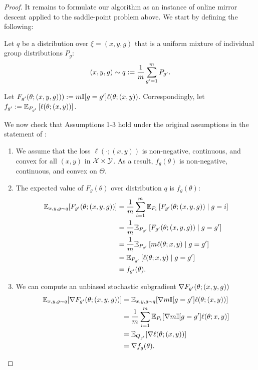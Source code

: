 \begin{proof}
  It remains to formulate our algorithm as an instance of online mirror descent applied to the saddle-point problem above. We start by defining the following:
  \begin{definition}
    Let $q$ be a distribution over $\xi = (x,y,g)$
    that is a uniform mixture of individual group distributions $P_g$:
    \begin{align}
        (x,y,g) \sim q := \frac{1}{m}\sum_{g^\prime=1}^{m} P_{g^\prime}.
    \end{align}
  \end{definition}

  \begin{definition}
    Let $F_{g^\prime}(\theta; (x,y,g))) := m\mathbb{I}[g=g^\prime]\ell(\theta; (x,y))$.
    Correspondingly, let $f_{g^\prime} := \mathbb{E}_{P_{g^\prime}}\left[\ell(\theta; (x,y))\right]$.
  \end{definition}

  We now check that Assumptions 1-3 hold under the original assumptions in the statement of :
  \begin{enumerate}
    \item We assume that the loss $\ell(\cdot; (x, y))$ is non-negative, continuous, and convex for all $(x, y)$ in $\mathcal{X} \times \mathcal{Y}$. As a result, $f_g(\theta)$ is non-negative, continuous, and convex on $\Theta$.

    \item The expected value of $F_{g}(\theta)$ over distribution $q$ is $f_g(\theta)$:
    \begin{align*}
        \mathbb{E}_{x,y,g\sim q}[F_{g^\prime}(\theta; (x,y,g))]
        &= \frac{1}{m}\sum_{i=1}^{m} \mathbb{E}_{P_{i}}\left[F_{g^\prime}(\theta; (x,y,g)) \mid g=i\right]\\
        &= \frac{1}{m} \mathbb{E}_{P_{g^\prime}}\left[F_{g^\prime}(\theta; (x,y,g))\mid g=g^\prime\right] \\
        &= \frac{1}{m} \mathbb{E}_{P_{g^\prime}}\left[m\ell(\theta; x,y) \mid g=g^\prime\right] \\
        &= \mathbb{E}_{P_{g^\prime}}\left[\ell(\theta; x,y) \mid g=g^\prime\right] \\
        &= f_{g^\prime}(\theta).
    \end{align*}

    \item We can compute an unbiased stochastic subgradient $\nabla F_{g^\prime}(\theta; (x,y,g))$
    \begin{align*}
        \mathbb{E}_{x,y,g\sim q}[\nabla F_{g^\prime}(\theta; (x,y,g))]
        &= \mathbb{E}_{x,y,g\sim q}[\nabla m\mathbb{I}[g=g^\prime]\ell(\theta; (x,y))] \\
        &= \frac{1}{m}\sum_{i=1}^{m}\mathbb{E}_{P_{i}}[\nabla m\mathbb{I}[g=g^\prime]\ell(\theta; x,y)] \\
        &= \mathbb{E}_{Q_{g^\prime}}[\nabla\ell(\theta; (x,y))] \\
        &= \nabla f_g(\theta).
    \end{align*}
  \end{enumerate}


\end{proof}
